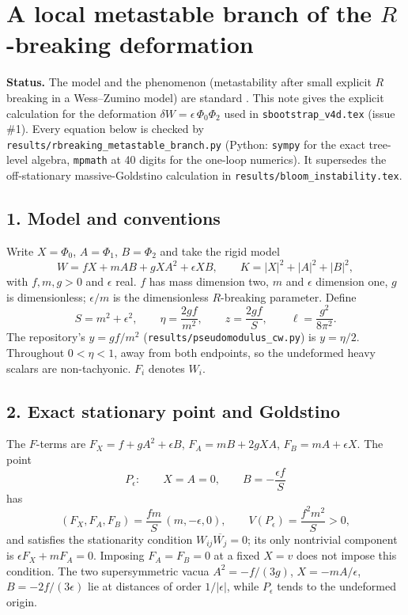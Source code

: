 \documentclass[11pt]{article}
\begin{document}
\section*{A local metastable branch of the $R$-breaking deformation}

\noindent\textbf{Status.} The model and the phenomenon (metastability
after small explicit $R$ breaking in a Wess--Zumino model) are standard
\cite{IS2007}. This note gives the explicit calculation for the
deformation $\delta W=\epsilon\,\Phi_0\Phi_2$ used in
\texttt{sbootstrap\_v4d.tex} (issue \#1). Every equation below is checked
by \texttt{results/rbreaking\_metastable\_branch.py} (Python: \texttt{sympy}
for the exact tree-level algebra, \texttt{mpmath} at 40 digits for the
one-loop numerics). It supersedes the off-stationary massive-Goldstino
calculation in \texttt{results/bloom\_instability.tex}.

\subsection*{1. Model and conventions}

Write $X=\Phi_0$, $A=\Phi_1$, $B=\Phi_2$ and take the rigid model
\begin{equation}
W=fX+mAB+gXA^2+\epsilon XB,\qquad K=|X|^2+|A|^2+|B|^2,
\end{equation}
with $f,m,g>0$ and $\epsilon$ real. $f$ has mass dimension two, $m$ and
$\epsilon$ dimension one, $g$ is dimensionless; $\epsilon/m$ is the
dimensionless $R$-breaking parameter. Define
\begin{equation}
S=m^2+\epsilon^2,\qquad \eta=\frac{2gf}{m^2},\qquad z=\frac{2gf}{S},
\qquad \ell=\frac{g^2}{8\pi^2}.
\end{equation}
The repository's $y=gf/m^2$ (\texttt{results/pseudomodulus\_cw.py}) is
$y=\eta/2$. Throughout $0<\eta<1$, away from both endpoints, so the
undeformed heavy scalars are non-tachyonic. $F_i$ denotes $W_i$.

\subsection*{2. Exact stationary point and Goldstino}

The $F$-terms are $F_X=f+gA^2+\epsilon B$, $F_A=mB+2gXA$,
$F_B=mA+\epsilon X$. The point
\begin{equation}
P_\epsilon:\qquad X=A=0,\qquad B=-\frac{\epsilon f}{S}
\end{equation}
has
\begin{equation}
(F_X,F_A,F_B)=\frac{fm}{S}\,(m,-\epsilon,0),\qquad V(P_\epsilon)=\frac{f^2m^2}{S}>0,
\end{equation}
and satisfies the stationarity condition $W_{ij}\overline{W_j}=0$; its only
nontrivial component is $\epsilon F_X+mF_A=0$. Imposing $F_A=F_B=0$ at a
fixed $X=v$ does not impose this condition. The two supersymmetric vacua
$A^2=-f/(3g)$, $X=-mA/\epsilon$, $B=-2f/(3\epsilon)$ lie at distances of
order $1/|\epsilon|$, while $P_\epsilon$ tends to the undeformed origin.
\end{document}

